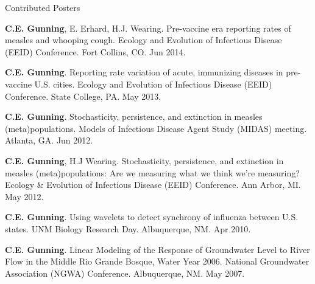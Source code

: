 \documentclass{resume} %
\begin{document}
\begin{rSection}{Contributed Posters}
\item {\bf C.E. Gunning}, E. Erhard, H.J. Wearing.  Pre-vaccine era reporting
rates of measles and whooping cough. Ecology and Evolution of Infectious Disease
(EEID) Conference. Fort Collins, CO. Jun 2014. 
\item {\bf C.E. Gunning}. Reporting rate variation of acute, immunizing diseases in
pre-vaccine U.S. cities. Ecology and Evolution of Infectious Disease
(EEID) Conference. State College, PA. May 2013. 
\item {\bf C.E. Gunning}. Stochasticity, persistence, and extinction in measles
(meta)populations. Models of Infectious Disease Agent Study
(MIDAS) meeting. Atlanta, GA. Jun 2012. 
\item {\bf C.E. Gunning}, H.J Wearing. Stochasticity, persistence, and extinction in measles
(meta)populations: Are we measuring what we think we're
measuring? Ecology \& Evolution of Infectious Disease (EEID) Conference. Ann Arbor, MI. May 2012.
\item {\bf C.E. Gunning}. Using wavelets to detect synchrony of influenza between U.S.
states. UNM Biology Research Day. Albuquerque, NM.  Apr 2010. 
\item {\bf C.E. Gunning}. Linear Modeling of the Response of Groundwater Level to River Flow
in the Middle Rio Grande Bosque, Water Year 2006. National
Groundwater Association (NGWA) Conference. Albuquerque, NM. May 2007. 
\end{rSection}
\end{document}

